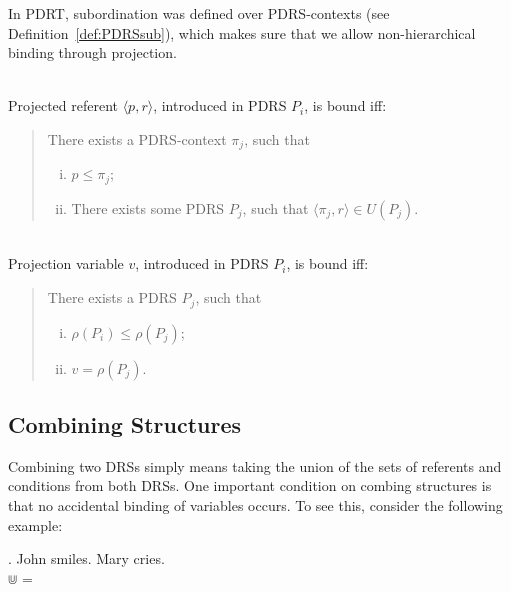 In PDRT, subordination was defined over PDRS-contexts (see
Definition~\ref{def:PDRSsub}), which makes sure that we allow
non-hierarchical binding through projection.

\begin{definition}~\\
Projected referent $\langle p,r\rangle$, introduced in PDRS $P_i$, is bound
iff:
\begin{quote}
There exists a PDRS-context $\pi_j$, such that
\begin{enumerate}[i.]
  \item $p \leq \pi_j$; 
  \item There exists some PDRS $P_j$, such that 
    $\langle \pi_j,r\rangle \in U(P_j)$.
\end{enumerate}
\end{quote}
\end{definition}

\begin{definition}~\\
Projection variable $v$, introduced in PDRS $P_i$, is bound iff:
\begin{quote}
There exists a PDRS $P_j$, such that
\begin{enumerate}[i.]
  \item $\rho(P_i) \leq \rho(P_j)$; 
  \item $v = \rho(P_j)$.
\end{enumerate}
\end{quote}
\end{definition}


\subsection{Combining Structures}

Combining two DRSs simply means taking the union of the sets of referents
and conditions from both DRSs. One important condition on combing structures
is that no accidental binding of variables occurs. To see this, consider the
following example:

\ex. John smiles. Mary cries.\\
   $\Cup$  = 

